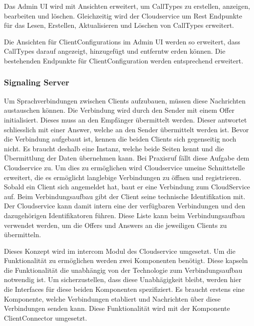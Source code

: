 Das Admin UI wird mit Ansichten erweitert, um CallTypes zu erstellen, anzeigen, bearbeiten und löschen.
Gleichzeitig wird der Cloudservice um Rest Endpunkte für das Lesen, Erstellen, Aktualisieren und Löschen von CallTypes erweitert.

Die Ansichten für ClientConfigurations im Admin UI werden so erweitert, dass CallTypes darauf angezeigt, hinzugefügt und entferntw erden können.
Die bestehenden Endpunkte für ClientConfiguration werden entsprechend erweitert.

\clearpage

\subsubsection{Signaling Server}

Um Sprachverbindungen zwischen Clients aufzubauen, müssen diese Nachrichten austauschen können.
Die Verbindung wird durch den Sender mit einem Offer initialisiert.
Dieses muss an den Empfänger übermittelt werden.
Dieser antwortet schliesslich mit einer Answer, welche an den Sender übermittelt werden ist.
Bevor die Verbindung aufgebaut ist, kennen die beiden Clients sich gegenseitig noch nicht.
Es braucht deshalb eine Instanz, welche beide Seiten kennt und die Übermittlung der Daten übernehmen kann.
Bei Praxisruf fällt diese Aufgabe dem Cloudservice zu.
Um dies zu ermöglichen wird Cloudservice umeine Schnittstelle erweitert, die es ermöglicht langlebige Verbindungen
zu öffnen und registrieren.
Sobald ein Client sich angemeldet hat, baut er eine Verbindung zum CloudService auf.
Beim Verbindungsaufbau gibt der Client seine technische Identifikation mit.
Der Cloudservice kann damit intern eine der verfügbaren Verbindungen und den dazugehörigen Identifikatoren führen.
Diese Liste kann beim Verbindungsaufbau verwendet werden, um die Offers und Answers an die jeweiligen Clients zu übermitteln.

Dieses Konzept wird im intercom Modul des Cloudservice umgesetzt.
Um die Funktionalität zu ermöglichen werden zwei Komponenten benötigt.
Diese kapseln die Funktionalität die unabhängig von der Technologie zum Verbindungsaufbau notwendig ist.
Um sicherzustellen, dass diese Unabhägigkeit bleibt, werden hier die Interfaces für diese beiden Komponenten spezifiziert.
Es braucht erstens eine Komponente, welche Verbindungen etabliert und Nachrichten über diese Verbindungen senden kann.
Diese Funktionalität wird mit der Komponente ClientConnector umgesetzt.



